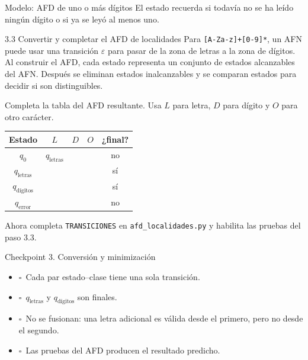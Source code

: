 \documentclass[11pt,spanish]{article}
\newcommand{\cuadro}{\(\square\)}
\begin{document}
\begin{modelo}{Modelo: AFD de uno o más dígitos}
El estado recuerda si todavía no se ha leído ningún dígito o si ya se leyó al menos uno.

\begin{center}
\end{center}
\end{modelo}

\begin{estacion}{3.3 Convertir y completar el AFD de localidades}
Para \texttt{[A-Za-z]+[0-9]*}, un AFN puede usar una transición \(\varepsilon\) para pasar de la zona de letras a la zona de dígitos. Al construir el AFD, cada estado representa un conjunto de estados alcanzables del AFN. Después se eliminan estados inalcanzables y se comparan estados para decidir si son distinguibles.

Completa la tabla del AFD resultante. Usa \(L\) para letra, \(D\) para dígito y \(O\) para otro carácter.

\begin{center}
\begin{tabular}{|c|c|c|c|c|}
\hline
\textbf{Estado} & \(L\) & \(D\) & \(O\) & \textbf{¿final?} \\
\hline
\(q_0\) & \(q_{\text{letras}}\) & & & no \\
\hline
\(q_{\text{letras}}\) & & & & sí \\
\hline
\(q_{\text{dígitos}}\) & & & & sí \\
\hline
\(q_{\text{error}}\) & & & & no \\
\hline
\end{tabular}
\end{center}

Ahora completa \texttt{TRANSICIONES} en \texttt{afd\_localidades.py} y habilita las pruebas del paso 3.3.
\end{estacion}

\begin{checkpoint}{Checkpoint 3. Conversión y minimización}
\begin{itemize}
  \item \cuadro\ Cada par estado--clase tiene una sola transición.
  \item \cuadro\ \(q_{\text{letras}}\) y \(q_{\text{dígitos}}\) son finales.
  \item \cuadro\ No se fusionan: una letra adicional es válida desde el primero, pero no desde el segundo.
  \item \cuadro\ Las pruebas del AFD producen el resultado predicho.
\end{itemize}
\end{checkpoint}
\end{document}
